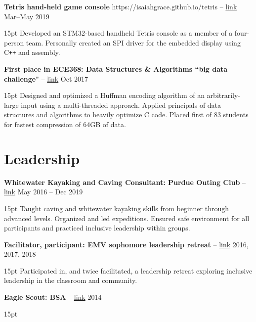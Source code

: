 \documentclass[10pt,letterpaper]{article}
\newcommand{\resumeItem}[4]{
	\begingroup
	\def\link{#2}
	\textbf{#1}
	\ifx\link\empty \else 
		-- \href{#2}{link}
	\fi
	\hfill #3\\
	\begin{adjustwidth}{15pt}{}
	#4
	\end{adjustwidth}
	\endgroup
}
\begin{document}
\resumeItem
{Tetris hand-held game console}
{https://isaiahgrace.github.io/tetris}
{Mar--May 2019}
{Developed an STM32-based handheld Tetris console as a member of a four-person team. Personally created an SPI driver for the embedded display using C\texttt{++} and assembly.}

\resumeItem
{First place in ECE368: Data Structures \& Algorithms ``big data challenge"}
{}
{Oct 2017}
{Designed and optimized a Huffman encoding algorithm of an arbitrarily-large input using a multi-threaded approach. Applied principals of data structures and algorithms to heavily optimize C code. Placed first of 83 students for fastest compression of 64GB of data.}


\section*{Leadership}
\resumeItem
{Whitewater Kayaking and Caving Consultant: Purdue Outing Club}
{}
{May 2016 -- Dec 2019}
{Taught caving and whitewater kayaking skills from beginner through advanced levels. Organized and led expeditions. Ensured safe environment for all participants and practiced inclusive leadership within groups.}

\resumeItem
{Facilitator, participant: EMV sophomore leadership retreat}
{}
{2016, 2017, 2018}
{Participated in, and twice facilitated, a leadership retreat exploring inclusive leadership in the classroom and community.}

\resumeItem
{Eagle Scout: BSA}
{}
{2014}
{}
\end{document}
